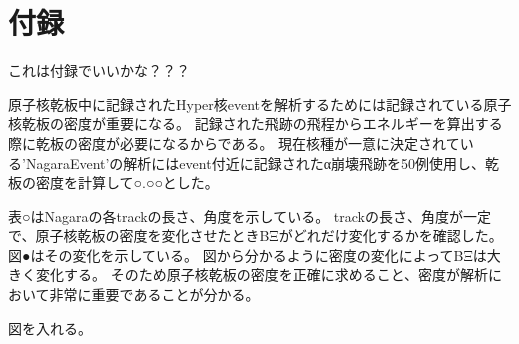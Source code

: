 \documentclass[12pt,a4paper]{jarticle}
\begin{document}
\section*{付録}
これは付録でいいかな？？？
\par
原子核乾板中に記録されたHyper核eventを解析するためには記録されている原子核乾板の密度が重要になる。
記録された飛跡の飛程からエネルギーを算出する際に乾板の密度が必要になるからである。
現在核種が一意に決定されている'NagaraEvent'の解析にはevent付近に記録されたα崩壊飛跡を50例使用し、乾板の密度を計算して○.○○とした。
\par
表○はNagaraの各trackの長さ、角度を示している。
trackの長さ、角度が一定で、原子核乾板の密度を変化させたときBΞがどれだけ変化するかを確認した。
図●はその変化を示している。
図から分かるように密度の変化によってBΞは大きく変化する。
そのため原子核乾板の密度を正確に求めること、密度が解析において非常に重要であることが分かる。
\par
図を入れる。
\par
\end{document}
